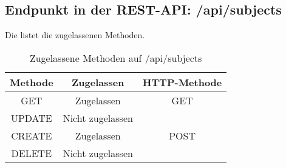 \subsection{Endpunkt in der REST-API: /api/subjects}
Die  listet die zugelassenen Methoden. 

\begin{table}[!htbp]
	\begin{tabular}{|c|c|c|}
		\hline
			\textbf{Methode} & \textbf{Zugelassen} & \textbf{HTTP-Methode} \\ \hline
			GET & Zugelassen & GET \\ \hline
			UPDATE & Nicht zugelassen & \\ \hline 
			CREATE & Zugelassen & POST \\ \hline 
			DELETE & Nicht zugelassen & \\ \hline
	\end{tabular}

		\caption{Zugelassene Methoden auf /api/subjects}
		\label{tab:end:rest:api:subjects:meth}
\end{table}